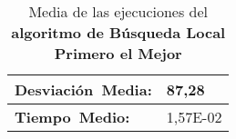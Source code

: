\begin{table}[!ht]%
    \centering
    \begin{tabular}{|l|l|}
        \hline
        \textbf{Desviación~Media:} & 87,28 \\ \hline
        \textbf{Tiempo~Medio:} & 1,57E-02 \\ \hline
    \end{tabular}
\caption{Media de las ejecuciones del \textbf{algoritmo de Búsqueda Local Primero el Mejor}}
\end{table}